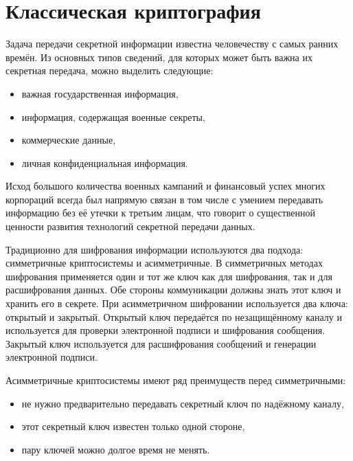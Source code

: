 
\section{Классическая криптография}
Задача передачи секретной информации известна человечеству с самых ранних времён. Из основных типов сведений, для которых может быть важна их
секретная передача, можно выделить следующие:
\begin{itemize}
  \item важная государственная информация,
  \item информация, содержащая военные секреты,
  \item коммерческие данные,
  \item личная конфиденциальная информация.
\end{itemize}

Исход большого количества военных кампаний и финансовый успех многих корпораций всегда был напрямую связан в том числе с умением передавать
информацию без её утечки к третьим лицам, что говорит о существенной ценности развития технологий секретной передачи данных.

Традиционно для шифрования информации используются два подхода: симметричные криптосистемы и асимметричные.
В симметричных методах шифрования применяется один и тот же ключ как для шифрования, так и для расшифрования данных. Обе стороны коммуникации должны знать этот ключ и хранить его в секрете.
При асимметричном шифровании используется два ключа: открытый и закрытый. Открытый ключ передаётся по незащищённому каналу и используется для проверки электронной подписи и шифрования сообщения.
Закрытый ключ используется для расшифрования сообщений и генерации электронной подписи. 

Асимметричные криптосистемы имеют ряд преимуществ перед симметричными: 
\begin{itemize}
  \item не нужно предварительно передавать секретный ключ по надёжному каналу,
  \item этот секретный ключ известен только одной стороне, 
  \item пару ключей можно долгое время не менять.
\end{itemize}

